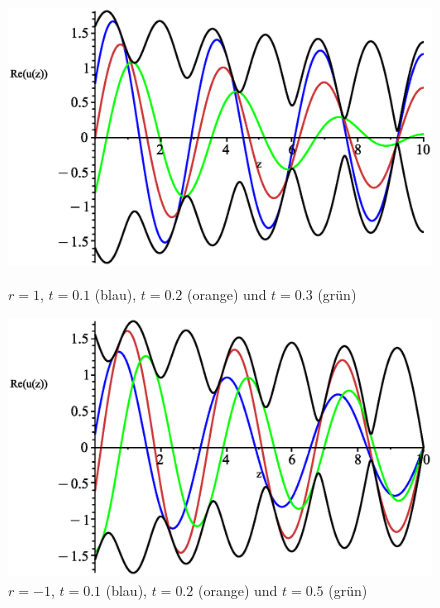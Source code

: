 \documentclass[paper=a4, parskip=half-, ngerman, fontsize=11pt]{scrreprt}
\begin{document}
\begin{figure}[!htpb]
    \vspace{1ex}

    \begin{minipage}{0.45\textwidth}
        \centering
        \includegraphics[width=\linewidth]{../graphics/Enveloppe/verlustbehaftet/R1}
        \caption*{$r=1$, $t=0.1$ (blau), $t=0.2$ (orange) und $t=0.3$ (grün)}
    \end{minipage}\hfill
    \begin{minipage}{0.45\textwidth}
        \centering
        \includegraphics[width=\linewidth]{../graphics/Enveloppe/verlustbehaftet/R-1}
        \caption*{$r=-1$, $t=0.1$ (blau), $t=0.2$ (orange) und $t=0.5$ (grün)}
    \end{minipage}
\end{figure}


\printbibliography
\end{document}
